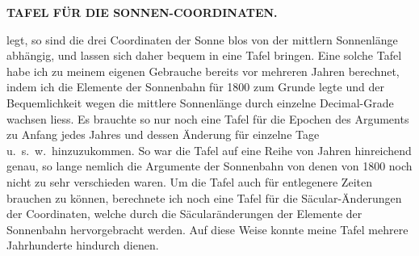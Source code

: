 \thispagestyle{empty}
\noindent{}%
\makebox[12mm][l]{}%
\parbox[t]{\dimexpr\linewidth-24mm\relax}{\centering\footnotesize\bfseries TAFEL FÜR DIE SONNEN-COORDINATEN.\par}%
\par\nobreak\medskip
\noindent legt, so sind die drei Coordinaten der Sonne blos von der mittlern Sonnenlänge abhängig, und lassen sich daher bequem in eine Tafel bringen. Eine solche Tafel habe ich zu meinem eigenen Gebrauche bereits vor mehreren Jahren berechnet, indem ich die Elemente der Sonnenbahn für 1800 zum Grunde legte und der Bequemlichkeit wegen die mittlere Sonnenlänge durch einzelne Decimal-Grade wachsen liess. Es brauchte so nur noch eine Tafel für die Epochen des Arguments zu Anfang jedes Jahres und dessen Änderung für einzelne Tage u.\ s.\ w.\ hinzuzukommen. So war die Tafel auf eine Reihe von Jahren hinreichend genau, so lange nemlich die Argumente der Sonnenbahn von denen von 1800 noch nicht zu sehr verschieden waren. Um die Tafel auch für entlegenere Zeiten brauchen zu können, berechnete ich noch eine Tafel für die Säcular-Änderungen der Coordinaten, welche durch die Säcularänderungen der Elemente der Sonnenbahn hervorgebracht werden. Auf diese Weise konnte meine Tafel mehrere Jahrhunderte hindurch dienen.

